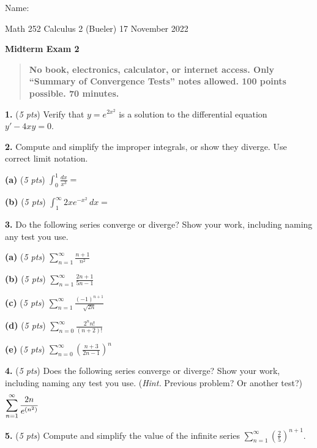 \documentclass[11pt]{amsart}
\newcommand{\ds}{\displaystyle}
\newcommand{\prob}[1]{\bigskip\noindent\textbf{#1.} }
\newcommand{\pts}[1]{(\emph{#1 pts})}
\newcommand{\probpts}[2]{\prob{#1} \pts{#2} \quad}
\newcommand{\epartpts}[2]{\medskip\noindent \textbf{(#1)} \pts{#2} \quad}
\begin{document}
\hfill \Large Name:\underline{\phantom{REALLY REALLY really really long long long name}}
\medskip

\scriptsize \noindent Math 252 Calculus 2 (Bueler) \hfill 17 November 2022
\medskip

\LARGE\centerline{\textbf{Midterm Exam 2}}

\smallskip
\begin{quote}
\large
\textbf{No book, electronics, calculator, or internet access.  Only ``Summary of Convergence Tests'' notes allowed.  100 points possible.  70 minutes.}
\end{quote}

\normalsize
\medskip

\thispagestyle{empty}

\probpts{1}{5}  Verify that $y=e^{2x^2}$ is a solution to the differential equation $\ds y'-4xy=0$.

\vfill

\prob{2}  Compute and simplify the improper integrals, or show they diverge.  Use correct limit notation.

\epartpts{a}{5} $\ds \int_0^1 \frac{dx}{x^3} =$
\vfill

\epartpts{b}{5} $\ds \int_1^\infty 2xe^{-x^2}\, dx = $
\vfill


\clearpage\newpage
\prob{3}  Do the following series converge or diverge?  Show your work, including naming any test you use.

\epartpts{a}{5}  $\ds \sum_{n=1}^\infty \frac{n+1}{n^2}$
\vfill

\epartpts{b}{5}  $\ds \sum_{n=1}^\infty \frac{2n+1}{5n-1}$
\vfill

\epartpts{c}{5}  $\ds \sum_{n=1}^\infty \frac{(-1)^{n+1}}{\sqrt{2n}}$
\vfill

\clearpage\newpage
\epartpts{d}{5}  $\ds \sum_{n=0}^\infty \frac{2^n n!}{(n+2)!}$
\vfill

\epartpts{e}{5}  $\ds \sum_{n=0}^\infty \left(\frac{n+3}{2n-1}\right)^n$
\vfill


\clearpage\newpage
\probpts{4}{5}  Does the following series converge or diverge?  Show your work, including naming any test you use.  (\emph{Hint.}  Previous problem?  Or another test?) \large
  $$\sum_{n=1}^\infty \frac{2n}{e^{(n^2)}} \hspace{4.5in}$$
\normalsize
\vfill

\probpts{5}{5}  Compute and simplify the value of the infinite series $\ds \sum_{n=1}^\infty \left(\frac{2}{5}\right)^{n+1}$.
\vfill
\end{document}
